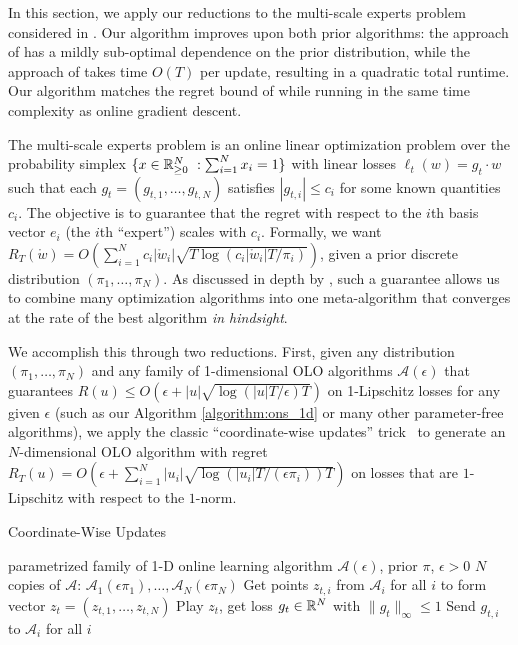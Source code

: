 \documentclass[12pt]{colt2018} %
\newcommand{\ol}{\mathcal{A}}
\newcommand{\w}{\mathring{w}}
\begin{document}
In this section, we apply our reductions to the multi-scale experts problem considered in \citep{foster2017parameter, bubeck2017online}. Our algorithm improves upon both prior algorithms: the approach of \citep{bubeck2017online} has a mildly sub-optimal dependence on the prior distribution, while the approach of \citep{foster2017parameter} takes time $O(T)$ per update, resulting in a quadratic total runtime. Our algorithm matches the regret bound of \citep{foster2017parameter} while running in the same time complexity as online gradient descent.

The multi-scale experts problem is an online linear optimization problem over the probability simplex $\{x\in\mathbb{R}_{\ge 0}^N\ : \sum_{i=1}^N x_i=1\}$ with linear losses $\ell_t(w)=g_t\cdot w$ such that each $g_t=(g_{t,1},\dots,g_{t,N})$ satisfies $|g_{t,i}|\le c_i$ for some known quantities $c_i$. The objective is to guarantee that the regret with respect to the $i$th basis vector $e_i$ (the $i$th ``expert'') scales with $c_i$. Formally, we want $R_T(\w) =O(\sum_{i=1}^N c_i|\w_i|\sqrt{T\log(c_i|\w_i|T/\pi_i)})$, given a prior discrete distribution $(\pi_1,\dots,\pi_N)$. As discussed in depth by \cite{foster2017parameter}, such a guarantee allows us to combine many optimization algorithms into one meta-algorithm that converges at the rate of the best algorithm \emph{in hindsight}.

We accomplish this through two reductions. First, given any distribution $(\pi_1,\dots,\pi_N)$ and any family of 1-dimensional OLO algorithms $\ol(\epsilon)$ that guarantees $R(u)\le O\left(\epsilon+|u|\sqrt{\log(|u|T/\epsilon)T}\right)$ on 1-Lipschitz losses for any given $\epsilon$ (such as our Algorithm \ref{algorithm:ons_1d} or many other parameter-free algorithms), we apply the classic ``coordinate-wise updates'' trick~\cite{streeter2010less} to generate an $N$-dimensional OLO algorithm with regret $R_T(u) = O\left(\epsilon+\sum_{i=1}^N |u_i|\sqrt{\log\left(|u_i|T/(\epsilon\pi_i)\right)T}\right)$ on losses that are $1$-Lipschitz with respect to the $1$-norm.

\begin{algorithm}[t]
\caption{Coordinate-Wise Updates}
\label{alg:coordinate-wise}
\begin{algorithmic}[1]
\REQUIRE parametrized family of 1-D online learning algorithm $\ol(\epsilon)$, prior $\pi$, $\epsilon>0$
 $N$ copies of $\ol$: $\ol_1(\epsilon\pi_1),\dots,\ol_N(\epsilon\pi_N)$
\STATE Get points $z_{t,i}$ from $\ol_i$ for all $i$ to form vector $z_t = (z_{t,1},\dots,z_{t,N})$
\STATE Play $z_t$, get loss $g_t\in \mathbb{R}^N$ with $\|g_t\|_\infty\le 1$
\STATE Send $g_{t,i}$ to $\ol_i$ for all $i$
\ENDFOR
\end{algorithmic}
\end{algorithm}
\end{document}
